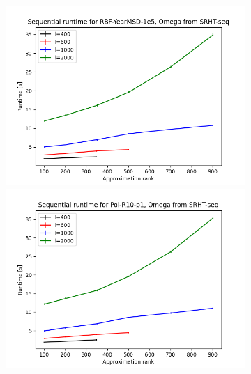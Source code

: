 \documentclass{article}
\theoremstyle{definition}
\begin{document}
\begin{appendices}
\begin{figure}
\begin{subfigure}[t]{\textwidth+20pt\relax}
    \includegraphics[width=\dimexpr\linewidth-20pt\relax]{plots/runtime/runtime_RBF-YearMSD-1e5_SRHT-seq.png}
    \includegraphics[width=\dimexpr\linewidth-20pt\relax]{plots/runtime/runtime_Pol-R10-p1_SRHT-seq.png}

\end{subfigure}
\end{figure}
\end{appendices}
\end{document}
